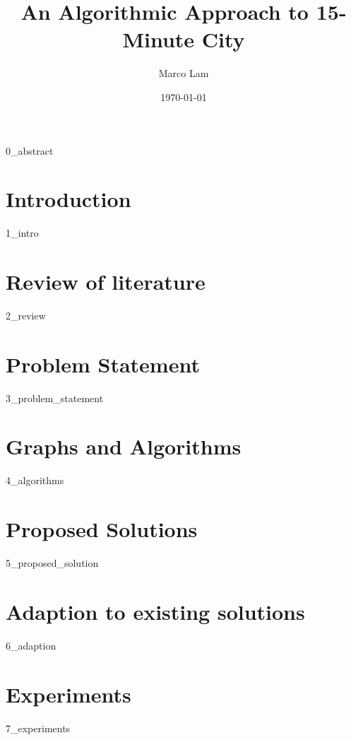\documentclass[oneside]{book}
\title{An Algorithmic Approach to 15-Minute City}
\author{Marco Lam}
\date{\today}
\begin{document}
\maketitle

{0_abstract}

\newpage

\tableofcontents
\listoftables
\listofalgorithms
\newpage

\chapter{Introduction}

{1_intro}

\newpage

\chapter{Review of literature} \label{review}

{2_review}

\newpage

\chapter{Problem Statement} \label{problem_statement}

{3_problem_statement}

\newpage

\chapter{Graphs and Algorithms} \label{algorithms}

{4_algorithms}

\newpage

\chapter{Proposed Solutions} \label{proposed_solution}

{5_proposed_solution}

\newpage

\chapter{Adaption to existing solutions} \label{adaption}

{6_adaption}

\newpage

\chapter{Experiments} \label{experiments}

{7_experiments}

\newpage


\end{document}
